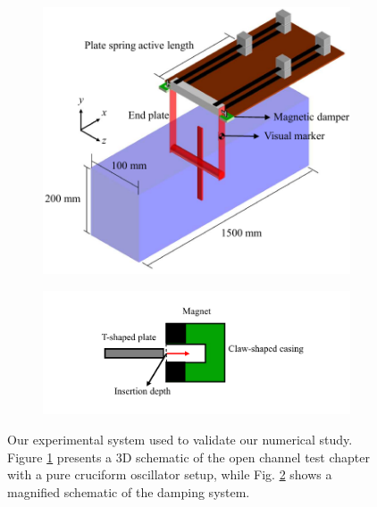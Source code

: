 \documentclass[oneside]{utmthesis}
\begin{document}
\begin{figure}
  \centering
  \begin{subfigure}[h]{0.5\textwidth}
    \includegraphics[width=\textwidth]{figs/rigSketch}
    \caption{}
    \label{fig:rigSketch}
  \end{subfigure}

  \begin{subfigure}[h]{0.35\textwidth}
    \includegraphics[width=\textwidth]{figs/damperSketch}
    \caption{}
    \label{fig:damperSketch}
  \end{subfigure}

  \caption{Our experimental system used to validate our numerical study. Figure \ref{fig:rigSketch} presents a 3D schematic of the open channel test chapter with a pure cruciform oscillator setup, while Fig. \ref{fig:damperSketch} shows a magnified schematic of the damping system.} \label{fig:experimentalSetup}
\end{figure}
\end{document}
